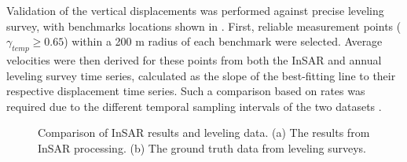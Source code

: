 Validation of the vertical displacements was performed against precise leveling survey, with benchmarks locations shown in . First, reliable measurement points ($\gamma_\textit{temp} \ge 0.65$) within a 200 m radius of each benchmark were selected. Average velocities were then derived for these points from both the InSAR and annual leveling survey time series, calculated as the slope of the best-fitting line to their respective displacement time series. Such a comparison based on rates was required due to the different temporal sampling intervals of the two datasets .

\begin{figure}[H]
	\centering
	
	\begin{subfigure}[b]{0.3\textwidth}
		\centering
		\framebox{\rule{0pt}{8cm}\rule{\textwidth}{0pt}}
		\caption{} %
		\label{fig:insar_leveling_a} %
	\end{subfigure}
	\quad
	\begin{subfigure}[b]{0.3\textwidth}
		\centering
		\framebox{\rule{0pt}{8cm}\rule{\textwidth}{0pt}}
		\caption{} %
		\label{fig:insar_leveling_b} %
	\end{subfigure}
	
	\caption{Comparison of InSAR results and leveling data. (a) The results from InSAR processing. (b) The ground truth data from leveling surveys.}
	\label{fig:insar_leveling} %
\end{figure}




